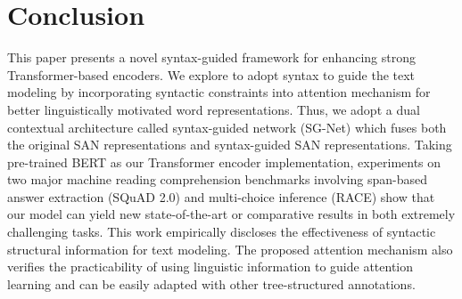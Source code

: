 \documentclass[letterpaper]{article} \usepackage{color}
\begin{document}
\section{Conclusion}
This paper presents a novel syntax-guided framework for enhancing strong Transformer-based encoders. We explore to adopt syntax to guide the text modeling by incorporating syntactic constraints into attention mechanism for better linguistically motivated word representations. Thus, we adopt a dual contextual architecture called syntax-guided network (SG-Net) which fuses both the original SAN representations and syntax-guided SAN representations. Taking pre-trained BERT as our Transformer encoder implementation, experiments on two major machine reading comprehension benchmarks involving span-based answer extraction (SQuAD 2.0) and multi-choice inference (RACE) show that our model can yield new state-of-the-art or comparative results in both extremely challenging tasks. This work empirically discloses the effectiveness of syntactic structural information for text modeling. The proposed attention mechanism also verifies the practicability of using linguistic information to guide attention learning and can be easily adapted with other tree-structured annotations.



\end{document}
